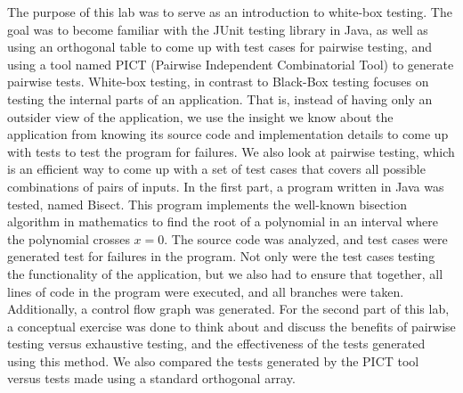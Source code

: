 The purpose of this lab was to serve as an introduction to white-box testing.
The goal was to become familiar with the JUnit testing library in Java, as well
as using an orthogonal table to come up with test cases for pairwise testing,
and using a tool named PICT (Pairwise Independent Combinatorial Tool) to
generate pairwise tests. White-box testing, in contrast to Black-Box testing
focuses on testing the internal parts of an application. That is, instead of
having only an outsider view of the application, we use the insight we know
about the application from knowing its source code and implementation details
to come up with tests to test the program for failures. We also look at
pairwise testing, which is an efficient way to come up with a set of test cases
that covers all possible combinations of pairs of inputs.  In the first part, a
program written in Java was tested, named Bisect.  This program implements the
well-known bisection algorithm in mathematics to find the root of a polynomial
in an interval where the polynomial crosses $x=0$. The source code was
analyzed, and test cases were generated test for failures in the program. Not
only were the test cases testing the functionality of the application, but we
also had to ensure that together, all lines of code in the program were
executed, and all branches were taken. Additionally, a control flow graph was
generated. For the second part of this lab, a conceptual exercise was done to
think about and discuss the benefits of pairwise testing versus exhaustive
testing, and the effectiveness of the tests generated using this method. We
also compared the tests generated by the PICT tool versus tests made using a
standard orthogonal array. 

